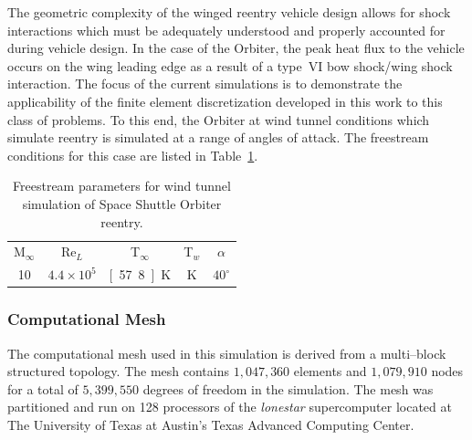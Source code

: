 The geometric complexity of the winged reentry vehicle design allows for shock interactions which must be adequately understood and properly accounted for during vehicle design.  In the case of the Orbiter, the peak heat flux to the vehicle occurs on the wing leading edge as a result of a type~VI bow shock/wing shock interaction.  The focus of the current simulations is to demonstrate the applicability of the finite element discretization developed in this work to this class of problems.  To this end, the Orbiter at wind tunnel conditions which simulate reentry is simulated at a range of angles of attack.  The freestream conditions for this case are listed in Table~\ref{table:orbiter-freestream-parameters}.
\begin{table}[hbtp]
  \begin{center}
    \caption{Freestream parameters for wind tunnel simulation of Space Shuttle Orbiter reentry.\label{table:orbiter-freestream-parameters}}
    \vspace{1em}
    \begin{tabular}{ccccc} \hline \hline
      M$_\infty$ & Re$_L$           & T$_\infty$ & T$_w$   & $\alpha$   \\
      10         & $4.4\times 10^5$ & \unit[57.8]{K}   & \unit[300]{K} & $40^\circ$ \\ \hline
    \end{tabular}
  \end{center}
\end{table}

\subsubsection{Computational Mesh}
The computational mesh used in this simulation is derived from a multi--block structured topology.  The mesh contains $1,047,360$ elements and $1,079,910$ nodes for a total of $5,399,550$ degrees of freedom in the simulation.  The mesh was partitioned and run on 128 processors of the \emph{lonestar} supercomputer located at The University of Texas at Austin's Texas Advanced Computing Center.


